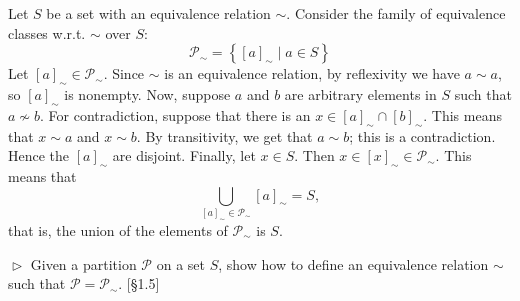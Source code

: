 \documentclass[12pt,letterpaper,boxed]{hmcpset}
\begin{document}
\begin{solution}
	Let $S$ be a set with an equivalence relation $\sim$.
	Consider the family of equivalence classes w.r.t. $\sim$ over $S$:
	\[ 
	\mathscr{P}_{\sim} = \left\{[a]_{\sim} \mid a\in S\right\} 
	\]
	Let $[a]_{\sim}\in\mathscr{P}_{\sim}$. Since $\sim$ is an equivalence relation,
	by reflexivity we have $a\sim a$, so $[a]_{\sim}$ is nonempty. Now, suppose
	$a$ and $b$ are arbitrary elements in $S$ such that $a\not\sim b$. For
	contradiction, suppose that there is an $x\in [a]_{\sim}\cap[b]_{\sim}$. This
	means that $x\sim a$ and $x\sim b$. By transitivity, we get that $a\sim b$; this
	is a contradiction. Hence the $[a]_{\sim}$ are disjoint. Finally, let $x\in S$.
	Then $x\in[x]_{\sim}\in \mathscr{P}_{\sim}$. This means that
	\[ \bigcup_{[a]_{\sim} \in \mathscr{P}_{\sim}} [a]_{\sim} = S, \]
	that is, the union of the elements of $\mathscr{P}_{\sim}$ is $S$.
\end{solution}

\hypertarget{Exercise I.1.3}{}
\begin{problem}[1.3]
	$\vartriangleright$ Given a partition $\mathscr{P}$ on a set $S$, show how to define an equivalence relation $\sim$ such that $\mathscr{P} = \mathscr{P}_{\sim}$. [\S1.5]
\end{problem}
\end{document}
